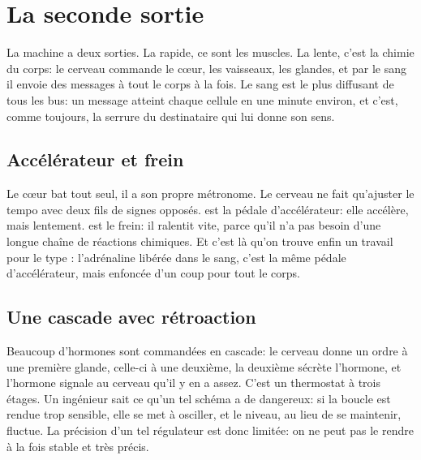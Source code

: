 \chapter{La seconde sortie}

La machine a deux sorties. La rapide, ce sont les muscles. La lente, c'est la chimie du corps: le cerveau commande le cœur, les vaisseaux, les glandes, et par le sang il envoie des messages à tout le corps à la fois. Le sang est le plus diffusant de tous les bus: un message atteint chaque cellule en une minute environ, et c'est, comme toujours, la \og serrure\fg{} du destinataire qui lui donne son sens.

\section*{Accélérateur et frein}

Le cœur bat tout seul, il a son propre métronome. Le cerveau ne fait qu'ajuster le tempo avec deux fils de signes opposés.  est la pédale d'accélérateur: elle accélère, mais lentement.  est le frein: il ralentit vite, parce qu'il n'a pas besoin d'une longue chaîne de réactions chimiques. Et c'est là qu'on trouve enfin un travail pour le type : l'adrénaline libérée dans le sang, c'est la même pédale d'accélérateur, mais enfoncée d'un coup pour tout le corps.


\section*{Une cascade avec rétroaction}

Beaucoup d'hormones sont commandées en cascade: le cerveau donne un ordre à une première glande, celle-ci à une deuxième, la deuxième sécrète l'hormone, et l'hormone signale au cerveau qu'il y en a assez. C'est un thermostat à trois étages. Un ingénieur sait ce qu'un tel schéma a de dangereux: si la boucle est rendue trop \og sensible\fg{}, elle se met à osciller, et le niveau, au lieu de se maintenir, fluctue. La précision d'un tel régulateur est donc limitée: on ne peut pas le rendre à la fois stable et très précis.

